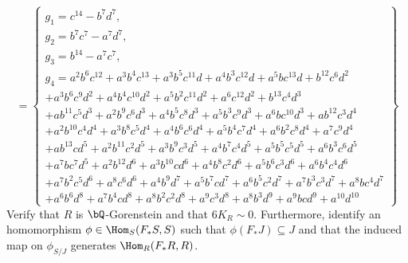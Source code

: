 \documentclass[12pt]{amsart}
\numberwithin{equation}{theorem}
\renewcommand{\:}{\colon}
\theoremstyle{theorem}
\begin{document}
\[
 = \left\{\begin{array}{c}
 g_1 = c^{14}-b^7d^7,\\
                                            g_2 = b^7c^7-a^7d^7,\\
                                            g_3 = b^{14}-a^7c^7,\\
                                            g_4 = a^2b^6c^{12}+a^3b^4c^{13}+a^3b^5c^{11}d+a^4b^3c^{12}d+a^5bc^{13}d+b^{12}c^6d^2\\
                                            +a^3b^6c^9d^2+a^4b^4c^{10}d^2+a^5b^2c^{11}d^2+a^6c^{12}d^2+b^{13}c^4d^3\\
                                            +ab^{11}c^5d^3+a^2b^9c^6d^3+a^4b^5c^8d^3+a^5b^3c^9d^3+a^6bc^{10}d^3+ab^{12}c^3d^4\\
                                            +a^2b^{10}c^4d^4+a^3b^8c^5d^4+a^4b^6c^6d^4+a^5b^4c^7d^4+a^6b^2c^8d^4+a^7c^9d^4\\
                                            +ab^{13}cd^5+a^2b^{11}c^2d^5+a^3b^9c^3d^5+a^4b^7c^4d^5+a^5b^5c^5d^5+a^6b^3c^6d^5\\
                                            +a^7bc^7d^5+a^2b^{12}d^6+a^3b^{10}cd^6+a^4b^8c^2d^6+a^5b^6c^3d^6+a^6b^4c^4d^6\\
                                            +a^7b^2c^5d^6+a^8c^6d^6+a^4b^9d^7+a^5b^7cd^7+a^6b^5c^2d^7+a^7b^3c^3d^7+a^8bc^4d^7\\
                                            +a^6b^6d^8+a^7b^4cd^8+a^8b^2c^2d^8+a^9c^3d^8+a^8b^3d^9+a^9bcd^9+a^{10}d^{10}
                                             \end{array} \right\}
\]
Verify that $R$ is $\bQ$-Gorenstein and that $6 K_R \sim 0$.  Furthermore, identify an homomorphism $\phi \in \Hom_S(F_* S, S)$ such that $\phi(F_* J) \subseteq J$ and that the induced map on $\phi_{S/J}$ generates $\Hom_R(F_* R, R)$.
\end{document}
